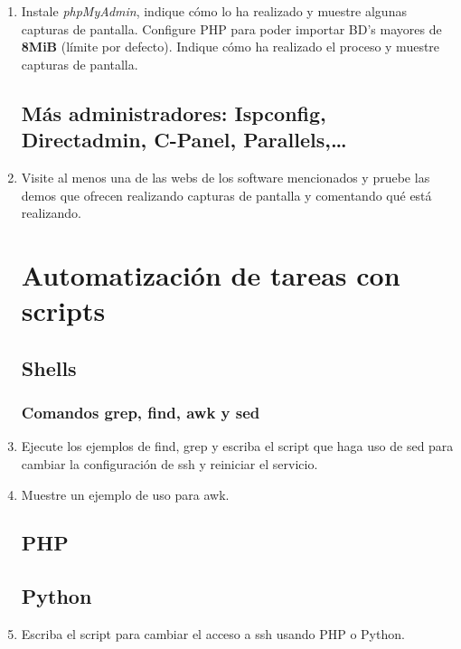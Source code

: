 \documentclass[paper=a4, fontsize=11pt]{scrartcl} %
\numberwithin{equation}{section} %
\numberwithin{figure}{section} %
\numberwithin{table}{section} %
\begin{document}
\begin{enumerate}
		\item Instale \textit{phpMyAdmin}, indique cómo lo ha realizado y muestre algunas capturas de
		pantalla. Configure PHP para poder importar BD's mayores de \textbf{8MiB} (límite por defecto).
		Indique cómo ha realizado el proceso y muestre capturas de pantalla.
	
	\subsection{Más administradores: Ispconfig, Directadmin, C-Panel, Parallels,\dots}
		\item Visite al menos una de las webs de los software mencionados y pruebe las demos que
		ofrecen realizando capturas de pantalla y comentando qué está realizando.
	
	\section{Automatización de tareas con scripts}
	\subsection{Shells}
	\subsubsection*{Comandos grep, find, awk y sed}
		\item Ejecute los ejemplos de find, grep y escriba el script que haga uso de sed para cambiar
		la configuración de ssh y reiniciar el servicio.
		
		
		\item Muestre un ejemplo de uso para awk.
	
	\subsection{PHP}
	\subsection{Python}
		\item Escriba el script para cambiar el acceso a ssh usando PHP o Python.
	

\end{enumerate}
\end{document}
